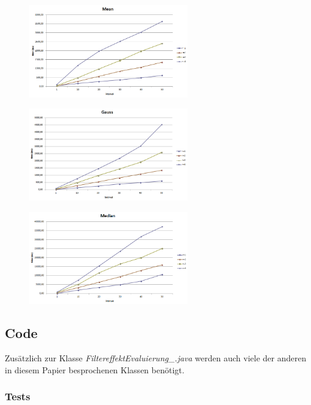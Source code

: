 \documentclass[12pt,german]{article}
\begin{document}
\begin{figure}[h]
	\includegraphics[width=7cm]{TimeEvaluationGraph_Mean.png}
\end{figure}
\begin{figure}[h]
	\includegraphics[width=7cm]{TimeEvaluationGraph_Gauss.png}
\end{figure}
\begin{figure}[h]
	\includegraphics[width=7cm]{TimeEvaluationGraph_Median.png}
\end{figure}


\subsection{Code}
Zusätzlich zur Klasse \textit{FiltereffektEvaluierung\_.java} werden auch viele der anderen in diesem Papier besprochenen Klassen benötigt.

\subsubsection{Tests}

\newpage
\end{document}
